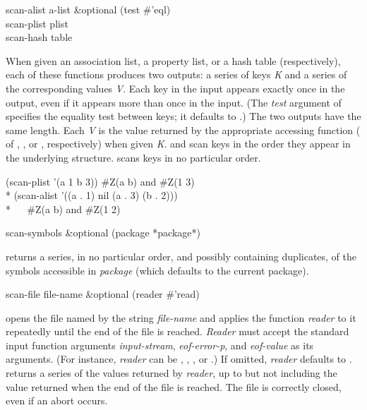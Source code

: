 \begin{defun}[Function]
scan-alist a-list &optional (test \#'eql) \\
scan-plist plist \\
scan-hash table

When given an association list, a property list, or a hash table
(respectively), each of these functions produces two outputs:  a series of keys
\emph{K} and a series of the corresponding values \emph{V}.  Each key in the
input appears exactly once in the output, even if it appears more than once
in the input.  (The \emph{test} argument of  specifies the
equality test between keys; it defaults to .)
The two outputs have the same length.  Each
\emph{V} is the value returned by the appropriate accessing function
( of , , or , respectively)
when given \emph{K}.   and  scan keys
in the order
they appear in the underlying structure.   scans keys in no
particular order.
\begin{lisp}
(scan-plist '(a 1 b 3)) {\EV} \#Z(a b) {\rm and} \#Z(1 3) \\*
(scan-alist '((a . 1) nil (a . 3) (b . 2))) \\*
~~{\EV} \#Z(a b) {\rm and} \#Z(1 2)
\end{lisp}
\end{defun}

\begin{defun}[Function]
scan-symbols &optional (package *package*)

 returns a series, in no particular order, and possibly
containing duplicates, of the symbols accessible in \emph{package} (which
defaults to the current package).
\end{defun}

\begin{defun}[Function]
scan-file file-name &optional (reader \#'read)

 opens the file named by the string \emph{file-name}
and applies the function \emph{reader} to it repeatedly until the end of the
file is reached.  \emph{Reader} must accept the standard input function
arguments \emph{input-stream}, \emph{eof-error-p}, and \emph{eof-value} as its
arguments.  (For instance, \emph{reader} can be ,
, , or
.) If omitted, \emph{reader} defaults to .
 returns a series of the values returned
by \emph{reader}, up to but not including the value returned
when the end of the file is reached.  The
file is correctly closed, even if an abort occurs. \end{defun}

